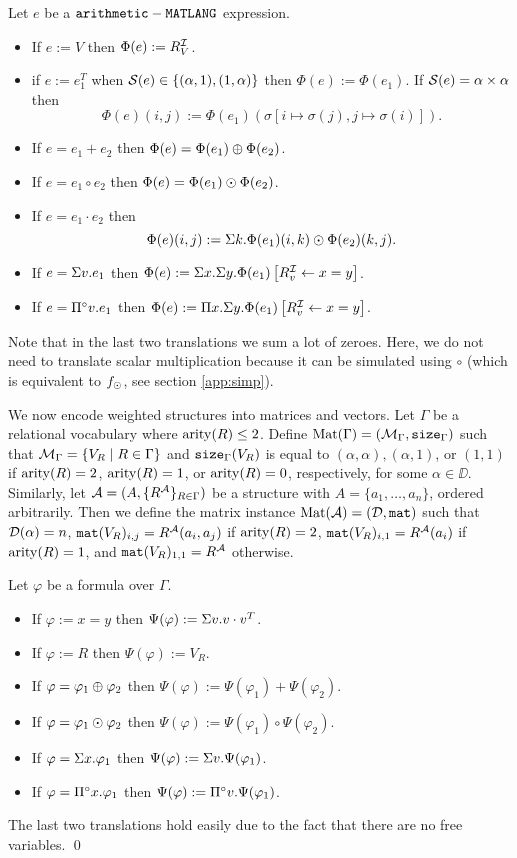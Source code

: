 Let $e$ be a $\texttt{arithmetic}-\texttt{MATLANG}$ expression.
\begin{itemize}
  \item If $e:=V$ then $\Phi(e):=R_V^{\mathcal{I}}$.
  \item if $e:= e_1^T$ when $\mathcal{S}(e)\in \{(\alpha,1), (1,\alpha)\}$ then $\Phi(e):=\Phi(e_1)$. If $\mathcal{S}(e)=\alpha\times\alpha$ then
  $$
  \Phi(e)(i,j):=\Phi(e_1)(\sigma\left[ i\mapsto \sigma(j), j\mapsto \sigma(i) \right]).
  $$
  \item If $e=e_1+e_2$ then $\Phi(e)=\Phi(e_1)\oplus \Phi(e_2)$.
  \item If $e=e_1\circ e_2$ then $\Phi(e)=\Phi(e_1)\odot \Phi(e_2)$.
  \item If $e=e_1\cdot e_2$ then 
  $$
  \Phi(e)(i,j):=\Sigma k. \Phi(e_1)(i,k)\odot\Phi(e_2)(k,j). 
  $$
  \item If $e=\Sigma v. e_1$ then $\Phi(e):=\Sigma x.\Sigma y.\Phi(e_1)\left[ R_v^{\mathcal{I}}\gets x=y \right]$.
  \item If $e=\Pi^{\circ} v. e_1$ then $\Phi(e):=\Pi x.\Sigma y.\Phi(e_1)\left[ R_v^{\mathcal{I}}\gets x=y \right]$.
\end{itemize}
Note that in the last two translations we sum a lot of zeroes. Here, we do not need to translate scalar multiplication
because it can be simulated using $\circ$ (which is equivalent to $f_{\odot}$, see section \ref{app:simp}).

We now encode weighted structures into matrices and vectors. Let $\Gamma$ be a relational vocabulary 
where $\operatorname{arity}(R) \leq 2$. 
Define $\text{Mat}(\Gamma) = (\mathcal{M}_\Gamma,\texttt{size}_\Gamma)$ such 
that $\mathcal{M}_\Gamma = \{ V_{R} \mid R \in \Gamma\}$ and $\texttt{size}_\Gamma(V_{R})$ is equal to 
$(\alpha, \alpha), (\alpha, 1)$, or $(1,1)$ if $\operatorname{arity}(R)=2$, $\operatorname{arity}(R)=1$, or $\operatorname{arity}(R)=0$, 
respectively, for some $\alpha \in \DD$. Similarly, let $\mathcal{A} = (A, \{R^{\mathcal{A}}\}_{R \in \Gamma})$ 
be a structure with $A = \{a_1, \ldots, a_n\}$, ordered arbitrarily.
Then we define the matrix instance $\text{Mat}(\mathcal{A}) = (\mathcal{D},\texttt{mat})$ such that $\mathcal{D}(\alpha) = n$, 
$\texttt{mat}(V_{R})_{i,j} = R^{\mathcal{A}}(a_i, a_j)$ if $\operatorname{arity}(R)=2$, $\texttt{mat}(V_{R})_{i,1} = R^{\mathcal{A}}(a_i)$ if $\operatorname{arity}(R)=1$, 
and $\texttt{mat}(V_{R})_{1,1} = R^{\mathcal{A}}$ otherwise.

Let $\varphi$ be a formula over $\Gamma$.
\begin{itemize}
  \item If $\varphi:=x=y$ then $\Psi(\varphi):= \Sigma v.v\cdot v^T$.
  \item If $\varphi:=R$ then $\Psi(\varphi):=V_R$.
  \item If $\varphi = \varphi_1 \oplus \varphi_2$ then $\Psi(\varphi):=\Psi(\varphi_1) + \Psi(\varphi_2)$.
  \item If $\varphi = \varphi_1 \odot \varphi_2$ then $\Psi(\varphi):=\Psi(\varphi_1) \circ \Psi(\varphi_2)$.
  \item If $\varphi = \Sigma x. \varphi_1$ then $\Psi(\varphi):=\Sigma v.\Psi(\varphi_1)$.
  \item If $\varphi = \Pi^{\circ} x. \varphi_1$ then $\Psi(\varphi):=\Pi^{\circ} v.\Psi(\varphi_1)$.
\end{itemize}

The last two translations hold easily due to the fact that there are no free variables.
\qed